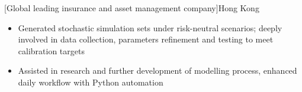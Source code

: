 \documentclass[cmu]{resume}
\begin{document}
    [Global leading insurance and asset management company]{Hong Kong}
    \begin{itemize}
        \item Generated stochastic simulation sets under risk-neutral scenarios; deeply involved in data collection, parameters refinement and testing to meet calibration targets
        \item Assisted in research and further development of modelling process, enhanced daily workflow with Python automation
    \end{itemize}


\end{document}

